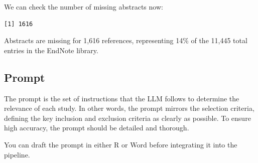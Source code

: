 \documentclass[
  letterpaper,
  DIV=11,
  numbers=noendperiod]{scrartcl}
\newenvironment{Shaded}{\begin{snugshade}}{\end{snugshade}}
\newcommand{\CommentTok}[1]{\textcolor[rgb]{0.37,0.37,0.37}{#1}}
\newcommand{\ConstantTok}[1]{\textcolor[rgb]{0.56,0.35,0.01}{#1}}
\newcommand{\FunctionTok}[1]{\textcolor[rgb]{0.28,0.35,0.67}{#1}}
\newcommand{\NormalTok}[1]{\textcolor[rgb]{0.00,0.23,0.31}{#1}}
\newcommand{\OtherTok}[1]{\textcolor[rgb]{0.00,0.23,0.31}{#1}}
\newcommand{\SpecialCharTok}[1]{\textcolor[rgb]{0.37,0.37,0.37}{#1}}
\newcommand{\StringTok}[1]{\textcolor[rgb]{0.13,0.47,0.30}{#1}}
\begin{document}
\begin{Shaded}
\end{Shaded}

We can check the number of missing abstracts now:

\begin{Shaded}
\end{Shaded}

\begin{verbatim}
[1] 1616
\end{verbatim}

Abstracts are missing for 1,616 references, representing 14\% of the
11,445 total entries in the EndNote library.

\subsection{Prompt}\label{prompt}

The prompt is the set of instructions that the LLM follows to determine
the relevance of each study. In other words, the prompt mirrors the
selection criteria, defining the key inclusion and exclusion criteria as
clearly as possible. To ensure high accuracy, the prompt should be
detailed and thorough.

You can draft the prompt in either R or Word before integrating it into
the pipeline.
\end{document}
